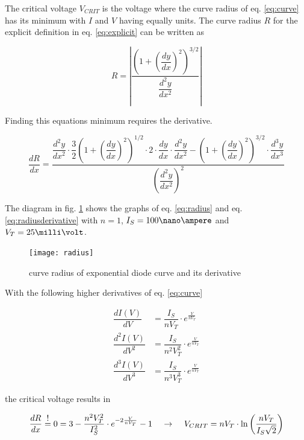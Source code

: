 \documentclass[10pt]{report}
\begin{document}
The critical voltage $V_{CRIT}$ is the voltage where the curve radius
of eq. \eqref{eq:curve} has its minimum with $I$ and $V$ having
equally units.  The curve radius $R$ for the explicit definition in
eq. \eqref{eq:explicit} can be written as

\begin{equation}
R = \left|\dfrac{\left(1+\left(\dfrac{dy}{dx}\right)^{2}\right)^{3/2}}{\dfrac{d^{2}y}{dx^{2}}}\right|
\label{eq:radius}
\end{equation}

Finding this equations minimum requires the derivative.

\begin{equation}
\dfrac{dR}{dx} = \dfrac{\dfrac{d^{2}y}{dx^{2}} \cdot \dfrac{3}{2}\left(1+\left(\dfrac{dy}{dx}\right)^{2}\right)^{1/2} \cdot 2 \cdot \dfrac{dy}{dx} \cdot \dfrac{d^{2}y}{dx^{2}} - \left(1+\left(\dfrac{dy}{dx}\right)^{2}\right)^{3/2} \cdot \dfrac{d^{3}y}{dx^{3}}}{\left(\dfrac{d^{2}y}{dx^{2}}\right)^{2}}
\label{eq:radiusderivative}
\end{equation}

The diagram in fig. \ref{fig:radius} shows the graphs of
eq. \eqref{eq:radius} and eq. \eqref{eq:radiusderivative} with $n=1$,
$I_{S}=100\nano\ampere$ and $V_{T}=25\milli\volt$.

\begin{figure}[ht]
\begin{center}
\texttt{[image: radius]}
\end{center}
\caption{curve radius of exponential diode curve and its derivative}
\label{fig:radius}
\end{figure}
\FloatBarrier

With the following higher derivatives of eq. \eqref{eq:curve}

\begin{align}
\dfrac{d I\left(V\right)}{dV} &= \dfrac{I_{S}}{n V_{T}}\cdot e^{\frac{V}{n V_{T}}}\\
\dfrac{d^{2} I\left(V\right)}{dV^{2}} &= \dfrac{I_{S}}{n^{2} V_{T}^{2}}\cdot e^{\frac{V}{n V_{T}}}\\
\dfrac{d^{3} I\left(V\right)}{dV^{3}} &= \dfrac{I_{S}}{n^{3} V_{T}^{3}}\cdot e^{\frac{V}{n V_{T}}}
\end{align}

the critical voltage results in

\begin{equation}
\dfrac{dR}{dx} \;\shortstack{!\\=}\; 0 = 3 - \dfrac{n^{2} V_{T}^{2}}{I_{S}^{2}}\cdot e^{-2\frac{V}{n V_{T}}} - 1
\;\;\;\; \rightarrow \;\;\;\;
V_{CRIT} = n V_{T}\cdot \ln{\left(\dfrac{n V_{T}}{I_{S} \sqrt{2}}\right)}
\end{equation}
\end{document}
